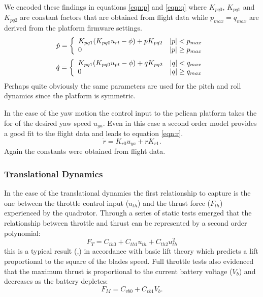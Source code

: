 \documentclass[a4paper,11pt]{report}
\begin{document}
We encoded these findings in equations \ref{eqn:p} and \ref{eqn:q} where $K_{pq0}$, $K_{pq1}$ and $K_{pq2}$ are constant factors that are obtained from flight data while $p_{max}=q_{max}$ are derived from the platform firmware settings.
\begin{equation}\label{eqn:p}
\dot{p}  =  \left\{ \begin{array}{l l} K_{pq1} (K_{pq0} u_{rl} - \phi) + p K_{pq2} & |p|<p_{max} \\ 0  & |p|\geq p_{max} \end{array} \right .\\
\end{equation}
\begin{equation}\label{eqn:q}
\dot{q}  =  \left\{ \begin{array}{l l} K_{pq1} (K_{pq0} u_{pt} - \phi) + q K_{pq2} & |q|<q_{max} \\ 0  & |q|\geq q_{max} \end{array} \right .\\
\end{equation}
Perhaps quite obviously the same parameters are used for the pitch and roll dynamics since the platform is symmetric. 

In the case of the yaw motion the control input to the pelican platform takes the for of the desired yaw speed $u_{ya}$. Even in this case a second order model provides a good fit to the flight data and leads to equation \ref{eqn:r}. 
\begin{equation}\label{eqn:r}
\dot{r} = K_{r0} u_{ya} + r K_{r1}.
\end{equation}
Again the constants were obtained from flight data. 

\subsubsection{Translational Dynamics}

In the case of the translational dynamics the first relationship to capture is the one between the throttle control input ($u_{th}$) and the thrust force ($F_{th}$) experienced by the quadrotor. 
Through a series of static tests emerged that the relationship between throttle and thrust can be represented by a second order polynomial: 
\begin{equation}
F_T = C_{th0} + C_{th1} u_{th} + C_{th2} u^2_{th} \label{eqn:ft}
\end{equation}
 this is a typical result (\cite{denardi2010phd},\cite{hoffmann07quadrotor}) in accordance with basic lift theory which predicts a lift proportional to the square of the blades speed.
Full throttle tests also evidenced that the maximum thrust is proportional to the current battery voltage ($V_b$) and decreases as the battery depletes: 
\begin{equation}
F_M = C_{vb0}+C_{vb1} V_b \label{eqn:fm}.
\end{equation}
\end{document}
